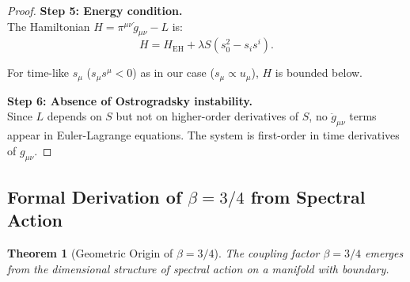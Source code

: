 \documentclass[11pt, a4paper]{article}
\theoremstyle{plain}
\newtheorem{theorem}{Theorem}[section]
\theoremstyle{definition}
\begin{document}
\begin{proof}
\textbf{Step 5: Energy condition.} \\
The Hamiltonian $H = \pi^{\mu\nu}\dot{g}_{\mu\nu} - L$ is:
\begin{equation}
H = H_{\text{EH}} + \lambda S (s_0^2 - s_i s^i).
\end{equation}

For time-like $s_\mu$ ($s_\mu s^\mu < 0$) as in our case ($s_\mu \propto u_\mu$), $H$ is bounded below.

\textbf{Step 6: Absence of Ostrogradsky instability.} \\
Since $L$ depends on $S$ but not on higher-order derivatives of $S$, no $\ddot{g}_{\mu\nu}$ terms appear in Euler-Lagrange equations. The system is first-order in time derivatives of $g_{\mu\nu}$.
\end{proof}

\subsection{Formal Derivation of \texorpdfstring{$\beta = 3/4$}{β=3/4} from Spectral Action}
\label{app:beta_derivation_proof}

\begin{theorem}[Geometric Origin of $\beta = 3/4$]
The coupling factor $\beta = 3/4$ emerges from the dimensional structure of spectral action on a manifold with boundary.
\end{theorem}
\end{document}
